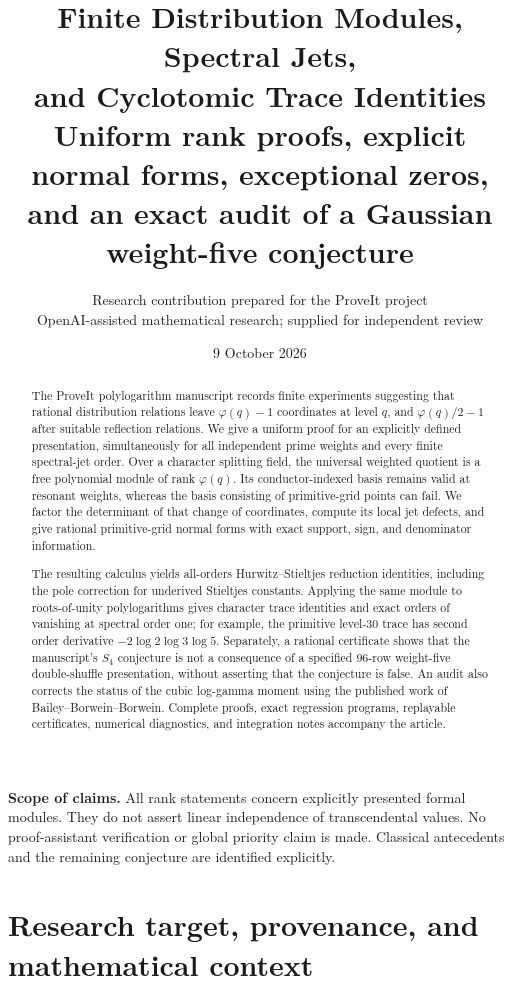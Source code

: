 \documentclass[11pt]{article}
\title{\textbf{Finite Distribution Modules, Spectral Jets,\\ and Cyclotomic Trace Identities}\\[8pt]
\large Uniform rank proofs, explicit normal forms, exceptional zeros,\\
and an exact audit of a Gaussian weight-five conjecture}
\author{Research contribution prepared for the ProveIt project\\
\small OpenAI-assisted mathematical research; supplied for independent review}
\date{9 October 2026}
\numberwithin{equation}{section}
\theoremstyle{definition}
\theoremstyle{remark}
\begin{document}
\maketitle
\begin{abstract}
The ProveIt polylogarithm manuscript records finite experiments suggesting
that rational distribution relations leave $\varphi(q)-1$ coordinates at
level $q$, and $\varphi(q)/2-1$ after suitable reflection relations. We give
a uniform proof for an explicitly defined presentation, simultaneously for
all independent prime weights and every finite spectral-jet order. Over a
character splitting field, the universal weighted quotient is a free
polynomial module of rank $\varphi(q)$. Its conductor-indexed basis remains
valid at resonant weights, whereas the basis consisting of primitive-grid
points can fail. We factor the determinant of that change of coordinates,
compute its local jet defects, and give rational primitive-grid normal
forms with exact support, sign, and denominator information.

The resulting calculus yields all-orders Hurwitz--Stieltjes reduction
identities, including the pole correction for underived Stieltjes
constants. Applying the same module to roots-of-unity polylogarithms gives
character trace identities and exact orders of vanishing at spectral
order one; for example, the primitive level-$30$ trace has second
order derivative $-2\log2\log3\log5$. Separately, a rational certificate
shows that the manuscript's $S_4$ conjecture is not a consequence of a
specified $96$-row weight-five double-shuffle presentation, without
asserting that the conjecture is false. An audit also corrects the status
of the cubic log-gamma moment using the published work of
Bailey--Borwein--Borwein. Complete proofs, exact regression programs,
replayable certificates, numerical diagnostics, and integration notes
accompany the article.
\end{abstract}
\noindent\textbf{Scope of claims.} All rank statements concern explicitly
presented formal modules. They do not assert linear independence of
transcendental values. No proof-assistant verification or global priority
claim is made. Classical antecedents and the remaining conjecture are
identified explicitly.
\newpage
\begingroup
\small
\makeatletter
\patchcmd{\l@section}{1.0em}{0.4em}{}{}
\makeatother
\tableofcontents
\endgroup
\newpage

\section{Research target, provenance, and mathematical context}\label{sec:scope}
\end{document}
